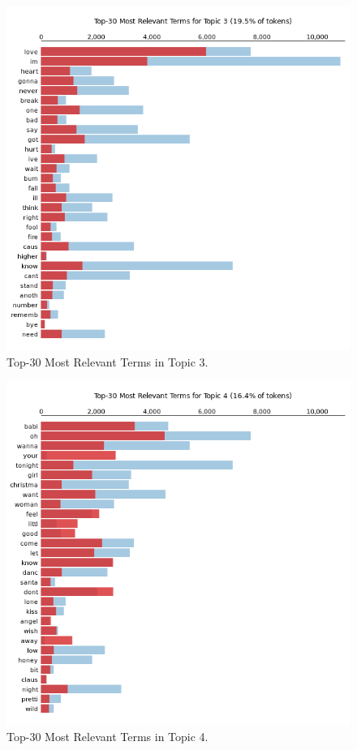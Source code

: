 \begin{center}
\begin{figure}[H]
  \centering
  \includegraphics[width=6in]{img/topics/png/t3.png}
  \caption{Top-30 Most Relevant Terms in Topic 3.}
  \label{Figure:t3}
\end{figure}
\end{center}

\begin{center}
\begin{figure}[H]
  \centering
  \includegraphics[width=6in]{img/topics/png/t4.png}
  \caption{Top-30 Most Relevant Terms in Topic 4.}
  \label{Figure:t4}
\end{figure}
\end{center}

